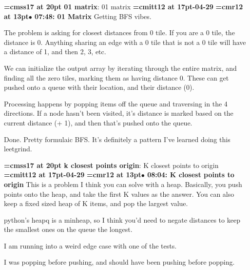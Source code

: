 {\medskip\noindent\bf\font\titlefont=cmss17 at 20pt 01 matrix}: 01 matrix
{\medskip\noindent\bf\font\titlefont=cmitt12 at 17pt-04-29}\medskip
{\smallskip\noindent\bf\font\titlefont=cmr12 at 13pt\titlefont $\bullet$ 07:48: 01 Matrix}\smallskip
Getting BFS vibes.
\par

The problem is asking for closest distances from 0 tile. If you are a 0 tile, the distance is 0. Anything sharing an edge with a 0 tile that is not a 0 tile will have a distance of 1, and then 2, 3, etc.
\par

We can initialize the output array by iterating through the entire matrix, and finding all the zero tiles, marking them as having distance 0. These can get pushed onto a queue with their location, and their distance (0).
\par

Processing happens by popping items off the queue and traversing in the 4 directions. If a node hasn't been visited, it's distance is marked based on the current distance (+ 1), and then that's pushed onto the queue.
\par

Done. Pretty formulaic BFS. It's definitely a pattern I've learned doing this leetgrind.
\par

{\medskip\noindent\bf\font\titlefont=cmss17 at 20pt k closest points origin}: K closest points to origin
{\medskip\noindent\bf\font\titlefont=cmitt12 at 17pt-04-29}\medskip
{\smallskip\noindent\bf\font\titlefont=cmr12 at 13pt\titlefont $\bullet$ 08:04: K closest points to origin}\smallskip
This is a problem I think you can solve with a heap. Basically, you push points onto the heap, and take the first K values as the answer. You can also keep a fixed sized heap of K items, and pop the largest value.
\par

python's heapq is a minheap, so I think you'd need to negate distances to keep the smallest ones on the queue the longest.
\par

I am running into a weird edge case with one of the tests.
\par

I was popping before pushing, and should have been pushing before popping.
\par

